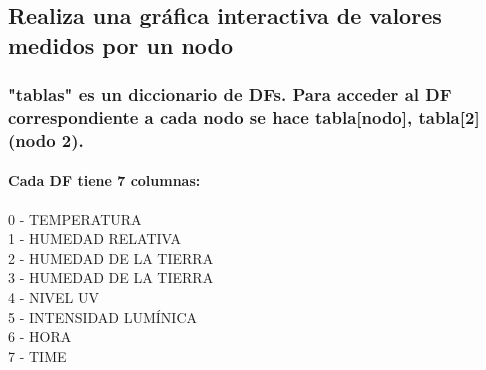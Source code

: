 \documentclass[11pt]{article}
\begin{document}
    \subsection{Realiza una gráfica interactiva de valores medidos por un
nodo}\label{realiza-una-gruxe1fica-interactiva-de-valores-medidos-por-un-nodo}

\subsubsection{"tablas" es un diccionario de DFs. Para acceder al DF
correspondiente a cada nodo se hace tabla{[}nodo{]}, tabla{[}2{]} (nodo
2).}\label{tablas-es-un-diccionario-de-dfs.-para-acceder-al-df-correspondiente-a-cada-nodo-se-hace-tablanodo-tabla2-nodo-2.}

\paragraph{Cada DF tiene 7 columnas:}\label{cada-df-tiene-7-columnas}

0 - TEMPERATURA\\
1 - HUMEDAD RELATIVA\\
2 - HUMEDAD DE LA TIERRA\\
3 - HUMEDAD DE LA TIERRA\\
4 - NIVEL UV\\
5 - INTENSIDAD LUMÍNICA\\
6 - HORA\\
7 - TIME
\end{document}
